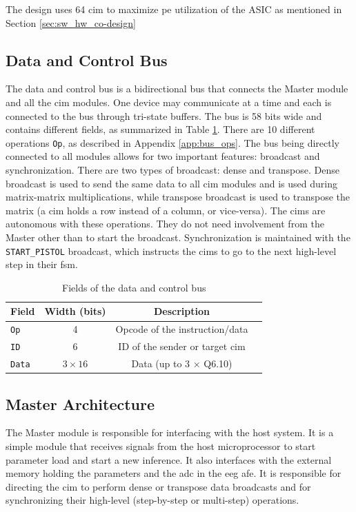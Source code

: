 The design uses 64 \ac{cim} to maximize \ac{pe} utilization of the ASIC as mentioned in Section \ref{sec:sw_hw_co-design}

\subsection{Data and Control Bus}
The data and control bus is a bidirectional bus that connects the Master module and all the \ac{cim} modules. One device may communicate at a time and each is connected to the bus
through tri-state buffers. The bus is 58 bits wide and contains different fields, as summarized in Table \ref{tab:bus_fields}. There are 10 different operations \texttt{Op}, as described
in Appendix \ref{app:bus_ops}. The bus being directly connected to all modules allows for two important features: broadcast and synchronization. There are two types of broadcast: dense
and transpose. Dense broadcast is used to send the same data to all \ac{cim} modules and is used during matrix-matrix multiplications, while transpose broadcast is used to transpose the
matrix (a \ac{cim} holds a row instead of a column, or vice-versa). The \ac{cim}s are autonomous with these operations. They do not need involvement from the Master other than to start
the broadcast. Synchronization is maintained with the \texttt{START\_PISTOL} broadcast, which instructs the \ac{cim}s to go to the next high-level step in their \ac{fsm}.

\begin{table}[ht]
    \centering
    \renewcommand{\arraystretch}{1.2} %
    \setlength{\arrayrulewidth}{1.5pt} %
    \caption{Fields of the data and control bus}
    \begin{tabular}{@{} p{1cm}ccc @{}}
        \toprule
        Field           & Width (bits)  & Description \\\midrule
        \texttt{Op}     & 4             & Opcode of the instruction/data \\
        \texttt{ID}     & 6             & ID of the sender or target \ac{cim} \\
        \texttt{Data}   & $3\times16$   & Data (up to 3 $\times$ Q6.10) \\
        \bottomrule
    \end{tabular}
    \label{tab:bus_fields}
\end{table}

\subsection{Master Architecture}
The Master module is responsible for interfacing with the host system. It is a simple module that receives signals from the host microprocessor to start parameter load and start a new
inference. It also interfaces with the external memory holding the parameters and the \ac{adc} in the \ac{eeg} \ac{afe}. It is responsible for directing the \ac{cim} to perform dense
or transpose data broadcasts and for synchronizing their high-level (step-by-step or multi-step) operations.

